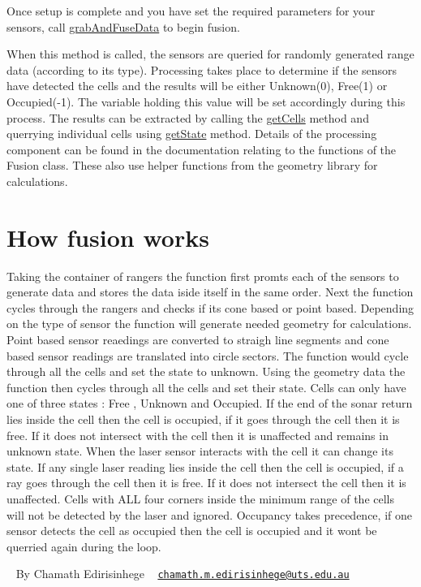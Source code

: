 Once setup is complete and you have set the required parameters for your sensors, call \hyperlink{classRangerFusion_aa9265f72bc3572567c9cf98cf6d9f0e1}{grab\+And\+Fuse\+Data} to begin fusion.

When this method is called, the sensors are queried for randomly generated range data (according to it\textquotesingle{}s type). Processing takes place to determine if the sensors have detected the cells and the results will be either Unknown(0), Free(1) or Occupied(-\/1). The variable holding this value will be set accordingly during this process. The results can be extracted by calling the \hyperlink{classRangerFusion_aaf0f90048ff744580eeb73a2bf3a38f7}{get\+Cells} method and querrying individual cells using \hyperlink{classCell_aba131004c3f0bade13ef1b72e5694885}{get\+State} method. Details of the processing component can be found in the documentation relating to the functions of the Fusion class. These also use helper functions from the geometry library for calculations.\hypertarget{index_ac_doc_fusion_more_info}{}\section{How fusion works}\label{index_ac_doc_fusion_more_info}
Taking the container of rangers the function first promts each of the sensors to generate data and stores the data iside itself in the same order. Next the function cycles through the rangers and checks if its cone based or point based. Depending on the type of sensor the function will generate needed geometry for calculations. Point based sensor reaedings are converted to straigh line segments and cone based sensor readings are translated into circle sectors. The function would cycle through all the cells and set the state to unknown. Using the geometry data the function then cycles through all the cells and set their state. Cells can only have one of three states \+: Free , Unknown and Occupied. If the end of the sonar return lies inside the cell then the cell is occupied, if it goes through the cell then it is free. If it does not intersect with the cell then it is unaffected and remains in unknown state. When the laser sensor interacts with the cell it can change its state. If any single laser reading lies inside the cell then the cell is occupied, if a ray goes through the cell then it is free. If it does not intersect the cell then it is unaffected. Cells with A\+LL four corners inside the minimum range of the cells will not be detected by the laser and ignored. Occupancy takes precedence, if one sensor detects the cell as occupied then the cell is occupied and it wont be querried again during the loop.

~\newline
 By Chamath Edirisinhege ~\newline
 \href{mailto:chamath.m.edirisinhege@uts.edu.au}{\tt chamath.\+m.\+edirisinhege@uts.\+edu.\+au} 